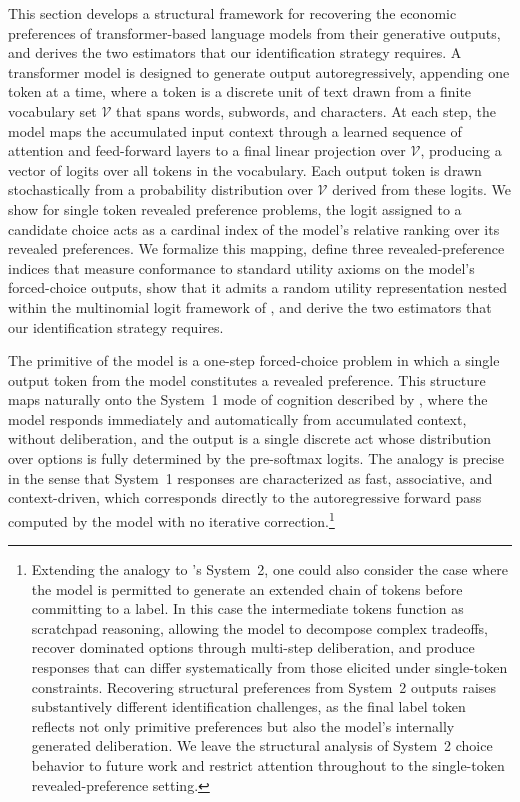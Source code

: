 This section develops a structural framework for recovering the economic preferences of transformer-based language models from their generative outputs, and derives the two estimators that our identification strategy requires. A transformer model is designed to generate output autoregressively, appending one token at a time, where a token is a discrete unit of text drawn from a finite vocabulary set $\mathcal{V}$ that spans words, subwords, and characters. At each step, the model maps the accumulated input context through a learned sequence of attention and feed-forward layers to a final linear projection over $\mathcal{V}$, producing a vector of logits over all tokens in the vocabulary. Each output token is drawn stochastically from a probability distribution over $\mathcal{V}$ derived from these logits. We show for single token revealed preference problems, the logit assigned to a candidate choice acts as a cardinal index of the model's relative ranking over its revealed preferences. We formalize this mapping, define three revealed-preference indices that measure conformance to standard utility axioms on the model's forced-choice outputs, show that it admits a random utility representation nested within the multinomial logit framework of \citet{mcfadden1972conditional}, and derive the two estimators that our identification strategy requires.

The primitive of the model is a one-step forced-choice problem in which a single output token from the model constitutes a revealed preference. This structure maps naturally onto the System~1 mode of cognition described by \citet{kahneman2003maps}, where the model responds immediately and automatically from accumulated context, without deliberation, and the output is a single discrete act whose distribution over options is fully determined by the pre-softmax logits. The analogy is precise in the sense that System~1 responses are characterized as fast, associative, and context-driven, which corresponds directly to the autoregressive forward pass computed by the model with no iterative correction.\footnote{Extending the analogy to \citet{kahneman2003maps}'s System~2, one could also consider the case where the model is permitted to generate an extended chain of tokens before committing to a label. In this case the intermediate tokens function as scratchpad reasoning, allowing the model to decompose complex tradeoffs, recover dominated options through multi-step deliberation, and produce responses that can differ systematically from those elicited under single-token constraints. Recovering structural preferences from System~2 outputs raises substantively different identification challenges, as the final label token reflects not only primitive preferences but also the model's internally generated deliberation. We leave the structural analysis of System~2 choice behavior to future work and restrict attention throughout to the single-token revealed-preference setting.}

